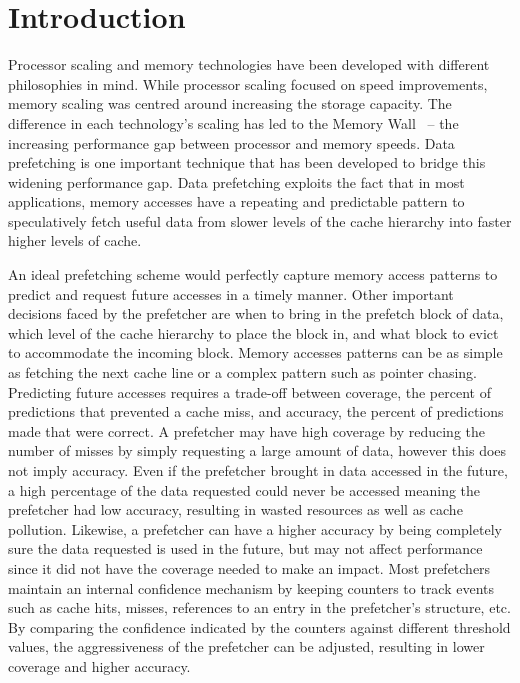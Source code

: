 \section{Introduction}
\label{Introduction}
Processor scaling and memory technologies have been developed with different
philosophies in mind.  While processor scaling focused on speed improvements,
memory scaling was centred around increasing the storage capacity.  The
difference in each technology's scaling has led to the Memory Wall~\cite{MemWall}
-- the increasing performance gap between processor and memory
speeds. Data prefetching is one important technique that has been developed 
to bridge this widening performance gap. Data prefetching exploits the fact that in most applications,
 memory accesses have a repeating and predictable pattern to speculatively fetch useful data from slower levels
of the cache hierarchy into faster higher levels of cache. %

An ideal prefetching scheme would perfectly capture memory access patterns to
predict and request future accesses in a timely manner. Other important decisions faced
by the prefetcher are when to bring in the prefetch block of data, which level
of the cache hierarchy to place the block in, and what block to evict to
accommodate the incoming block. Memory accesses patterns can be as simple as
fetching the next cache line or a complex pattern such as pointer chasing.
Predicting future accesses requires a trade-off between coverage, the percent of predictions that 
prevented a cache miss, and accuracy, the percent of predictions made that were correct. 
A prefetcher may have high coverage by reducing the number of misses by simply requesting a large 
amount of data, however this does not imply accuracy. Even if the prefetcher brought in data accessed in the future,
a high percentage of the data requested could never be accessed meaning the prefetcher had low accuracy, 
resulting in wasted resources as well as cache pollution. Likewise, a prefetcher can have a 
higher accuracy by being completely sure the data requested is used in the future, 
but may not affect performance since it did not have the coverage needed to make an impact. %
Most prefetchers maintain an internal confidence mechanism by keeping counters
to track events such as cache hits, misses, references to an entry in the prefetcher's
structure, etc. By comparing the confidence indicated by the counters against different 
threshold values, the aggressiveness of the prefetcher can be adjusted, resulting in lower
coverage and higher accuracy.

